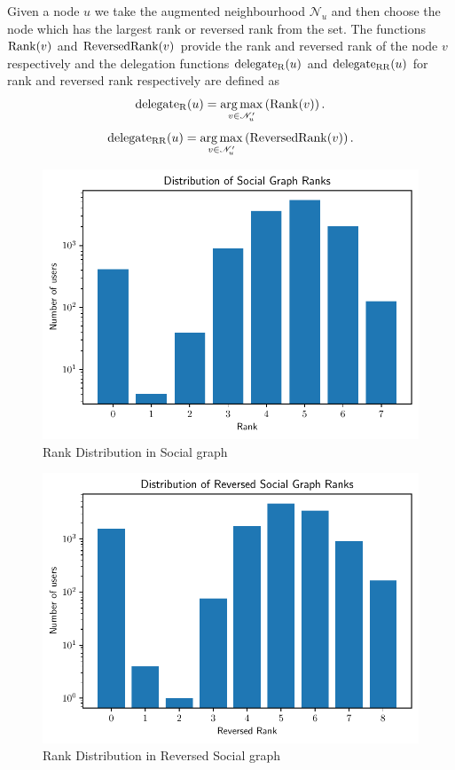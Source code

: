 Given a node $u$ we take the augmented neighbourhood $\mathcal{N}_u$ and then choose the node which has the largest rank or reversed rank from the set. The functions $\operatorname*{Rank}(v)$ and $\operatorname*{ReversedRank}(v)$ provide the rank and reversed rank of the node $v$ respectively and the delegation functions $\operatorname*{delegate_R}(u)$ and $\operatorname*{delegate_{RR}}(u)$ for rank and reversed rank respectively are defined as 
\[\operatorname*{delegate_R}(u)  = \operatorname*{arg\,max}_{v \in \mathcal{N}_u^\prime} \left(\operatorname*{Rank}(v) \right).\]
\[\operatorname*{delegate_{RR}}(u)  = \operatorname*{arg\,max}_{v \in \mathcal{N}_u^\prime} \left(\operatorname*{ReversedRank}(v) \right).\]

\begin{figure}[!ht]
    \centering
    \includegraphics[width=\linewidth]{images/Rank dist.pdf}
    \caption{Rank Distribution in Social graph}
    \label{fig:rank}
\end{figure}
\begin{figure}[!ht]
    \centering
    \includegraphics[width=\linewidth]{images/Reversed Rank dist.pdf}
    \caption{Rank Distribution in Reversed Social graph}
    \label{fig:reversed-rank}
\end{figure}

